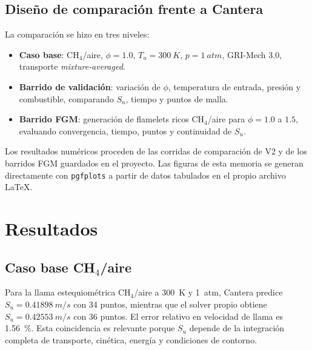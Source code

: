 \documentclass[12pt,a4paper]{article}
\begin{document}
\subsection{Diseño de comparación frente a Cantera}

La comparación se hizo en tres niveles:

\begin{itemize}
  \item \textbf{Caso base}: CH$_4$/aire, $\phi=1.0$, $T_u=\SI{300}{K}$, $p=\SI{1}{atm}$, GRI-Mech 3.0, transporte \textit{mixture-averaged}.
  \item \textbf{Barrido de validación}: variación de $\phi$, temperatura de entrada, presión y combustible, comparando $S_u$, tiempo y puntos de malla.
  \item \textbf{Barrido FGM}: generación de flamelets ricos CH$_4$/aire para $\phi=1.0$ a $1.5$, evaluando convergencia, tiempo, puntos y continuidad de $S_u$.
\end{itemize}

Los resultados numéricos proceden de las corridas de comparación de V2 y de los barridos FGM guardados en el proyecto. Las figuras de esta memoria se generan directamente con \texttt{pgfplots} a partir de datos tabulados en el propio archivo \LaTeX.

\section{Resultados}

\subsection{\texorpdfstring{Caso base CH$_4$/aire}{Caso base CH4/aire}}

Para la llama estequiométrica CH$_4$/aire a \SI{300}{K} y \SI{1}{atm}, Cantera predice $S_u=\SI{0.41898}{m/s}$ con 34 puntos, mientras que el solver propio obtiene $S_u=\SI{0.42553}{m/s}$ con 36 puntos. El error relativo en velocidad de llama es \SI{1.56}{\percent}. Esta coincidencia es relevante porque $S_u$ depende de la integración completa de transporte, cinética, energía y condiciones de contorno.
\end{document}
